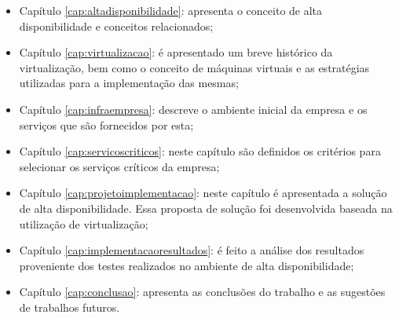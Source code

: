 \begin{itemize}
 \item Capítulo \ref{cap:altadisponibilidade}: apresenta o conceito de alta disponibilidade e conceitos relacionados;
 \item Capítulo \ref{cap:virtualizacao}: é apresentado um breve histórico da virtualização, bem como o conceito de máquinas virtuais e as 
 estratégias utilizadas para a implementação das mesmas;
 \item Capítulo \ref{cap:infraempresa}: descreve o ambiente inicial da empresa e os serviços que são fornecidos por esta;
 \item Capítulo \ref{cap:servicoscriticos}: neste capítulo são definidos os critérios para selecionar os serviços críticos da empresa;
 \item Capítulo \ref{cap:projetoimplementacao}: neste capítulo é apresentada a solução de alta disponibilidade. Essa proposta de solução foi 
 desenvolvida baseada na utilização de virtualização;
 \item Capítulo \ref{cap:implementacaoresultados}: é feito a análise dos resultados proveniente dos testes realizados no ambiente de alta 
 disponibilidade;
 \item Capítulo \ref{cap:conclusao}: apresenta as conclusões do trabalho e as sugestões de trabalhos futuros.
\end{itemize}
